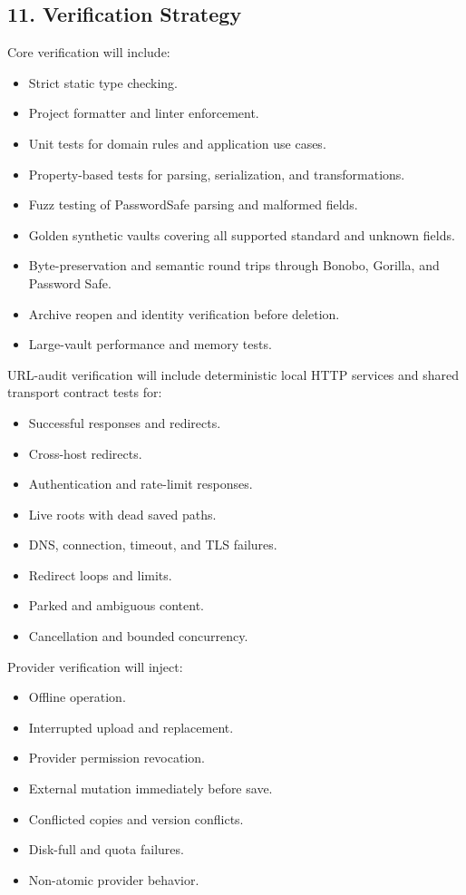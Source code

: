 \documentclass[
  letterpaper,
]{article}
\providecommand{\tightlist}{%
  \setlength{\itemsep}{0pt}\setlength{\parskip}{0pt}}
\begin{document}
\subsection{11. Verification Strategy}\label{11-verification-strategy}

Core verification will include:

\begin{itemize}
\tightlist
\item
  Strict static type checking.
\item
  Project formatter and linter enforcement.
\item
  Unit tests for domain rules and application use cases.
\item
  Property-based tests for parsing, serialization, and transformations.
\item
  Fuzz testing of PasswordSafe parsing and malformed fields.
\item
  Golden synthetic vaults covering all supported standard and unknown fields.
\item
  Byte-preservation and semantic round trips through Bonobo, Gorilla, and Password Safe.
\item
  Archive reopen and identity verification before deletion.
\item
  Large-vault performance and memory tests.
\end{itemize}

URL-audit verification will include deterministic local HTTP services and shared transport contract tests for:

\begin{itemize}
\tightlist
\item
  Successful responses and redirects.
\item
  Cross-host redirects.
\item
  Authentication and rate-limit responses.
\item
  Live roots with dead saved paths.
\item
  DNS, connection, timeout, and TLS failures.
\item
  Redirect loops and limits.
\item
  Parked and ambiguous content.
\item
  Cancellation and bounded concurrency.
\end{itemize}

Provider verification will inject:

\begin{itemize}
\tightlist
\item
  Offline operation.
\item
  Interrupted upload and replacement.
\item
  Provider permission revocation.
\item
  External mutation immediately before save.
\item
  Conflicted copies and version conflicts.
\item
  Disk-full and quota failures.
\item
  Non-atomic provider behavior.
\end{itemize}
\end{document}
